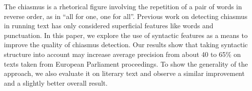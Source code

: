 The chiasmus is a rhetorical figure involving the repetition of a pair of words in reverse order, as in ``all for one, one for all''. Previous work on detecting chiasmus in running text has only considered superficial features like words and punctuation. In this paper, we explore the use of syntactic features as a means to improve the quality of chiasmus detection. Our results show that taking syntactic structure into account may increase average precision from about 40 to 65\% on texts taken from European Parliament proceedings. To show the generality of the approach, we also evaluate it on literary text and observe a similar improvement and a slightly better overall result.
